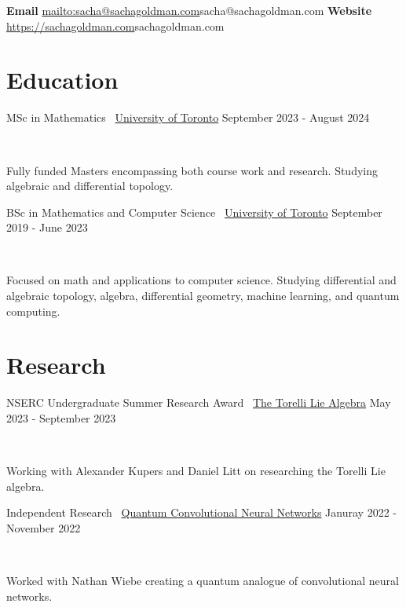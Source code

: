 \documentclass[]{style}
\begin{document}

\vspace{-5mm}
\begin{center}
	\textbf{Email}
	\url{mailto:sacha@sachagoldman.com}{sacha@sachagoldman.com} \hspace{1cm}
	\textbf{Website} 
	\url{https://sachagoldman.com}{sachagoldman.com}
\end{center}
\vspace{5mm}
 
\section{Education}

\begin{entrylist}

\vspace{1mm}

\entry
{MSc in Mathematics \ {\normalfont \underline{University of Toronto}}}
{September 2023 - August 2024}
{  ~ \vspace{-2.5mm}

Fully funded Masters encompassing both course work and research. Studying algebraic and differential topology. 
}

\entry
{BSc in Mathematics and Computer Science \ {\normalfont \underline{University of Toronto}}}
{September 2019 - June 2023}
{ ~ \vspace{-2.5mm}

Focused on math and applications to computer science. Studying differential  and algebraic topology, algebra, differential geometry, machine learning, and quantum computing.
}

\end{entrylist}

\section{Research}

\begin{entrylist}

\vspace{1mm}

\entry
{NSERC Undergraduate Summer Research Award \ {\normalfont \underline{The Torelli Lie Algebra}}}
{May 2023 - September 2023}
{ ~ \vspace{-2.5mm}

Working with Alexander Kupers and Daniel Litt on researching the Torelli Lie algebra.}

\entry
{Independent Research \ {\normalfont \underline{Quantum Convolutional Neural Networks}}}
{Januray 2022 - November 2022}
{ ~ \vspace{-2.5mm}

Worked with Nathan Wiebe creating a quantum analogue of convolutional neural networks.}

\end{entrylist}
\end{document}
